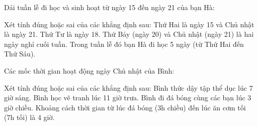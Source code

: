 \begin{ex} %
Dải tuần lễ đi học và sinh hoạt từ ngày 15 đến ngày 21 của bạn Hà:
\begin{center}\vspace{-3mm}
\vspace{-3mm}\end{center}
Xét tính đúng hoặc sai của các khẳng định sau:
\choiceTF
{\True Thứ Hai là ngày 15 và Chủ nhật là ngày 21.}
{Thứ Tư là ngày 18.}
{\True Thứ Bảy (ngày 20) và Chủ nhật (ngày 21) là hai ngày nghỉ cuối tuần.}
{\True Trong tuần lễ đó bạn Hà đi học 5 ngày (từ Thứ Hai đến Thứ Sáu).}
\end{ex}

\begin{ex} %
Các mốc thời gian hoạt động ngày Chủ nhật của Bình:
\begin{center}\vspace{-3mm}
\vspace{-3mm}\end{center}
Xét tính đúng hoặc sai của các khẳng định sau:
\choiceTF
{\True Bình thức dậy tập thể dục lúc 7 giờ sáng.}
{Bình học vẽ tranh lúc 11 giờ trưa.}
{\True Bình đi đá bóng cùng các bạn lúc 3 giờ chiều.}
{\True Khoảng cách thời gian từ lúc đá bóng (3h chiều) đến lúc ăn cơm tối (7h tối) là 4 giờ.}
\end{ex}

